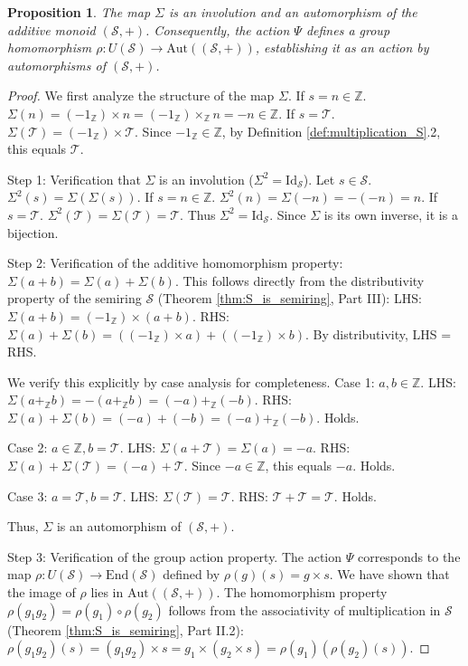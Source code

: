 \documentclass[11pt, a4paper]{article}
\theoremstyle{plain}
\newtheorem{proposition}[theorem]{Proposition}
\theoremstyle{definition}
\numberwithin{equation}{section}
\newcommand{\Z}{\mathbb{Z}}
\newcommand{\Tobj}{\mathcal{T}} %
\newcommand{\SemiringS}{\mathcal{S}}
\newcommand{\Aut}{\mathrm{Aut}}
\newcommand{\End}{\mathrm{End}}
\newcommand{\Id}{\mathrm{Id}}
\begin{document}
\begin{proposition}\label{prop:Sigma_additive_automorphism}
The map $\Sigma$ is an involution and an automorphism of the additive monoid $(\SemiringS, +)$. Consequently, the action $\Psi$ defines a group homomorphism $\rho: U(\SemiringS) \to \Aut((\SemiringS, +))$, establishing it as an action by automorphisms of $(\SemiringS, +)$.
\end{proposition}
\begin{proof}
We first analyze the structure of the map $\Sigma$.
If $s=n \in \Z$. $\Sigma(n) = (-1_{\Z})\times n = (-1_{\Z})\times_{\Z} n = -n \in \Z$.
If $s=\Tobj$. $\Sigma(\Tobj) = (-1_{\Z})\times\Tobj$. Since $-1_{\Z} \in \Z$, by Definition \ref{def:multiplication_S}.2, this equals $\Tobj$.

Step 1: Verification that $\Sigma$ is an involution ($\Sigma^2 = \Id_{\SemiringS}$).
Let $s \in \SemiringS$. $\Sigma^2(s) = \Sigma(\Sigma(s))$.
If $s=n \in \Z$. $\Sigma^2(n) = \Sigma(-n) = -(-n) = n$.
If $s=\Tobj$. $\Sigma^2(\Tobj) = \Sigma(\Tobj) = \Tobj$.
Thus $\Sigma^2 = \Id_{\SemiringS}$. Since $\Sigma$ is its own inverse, it is a bijection.

Step 2: Verification of the additive homomorphism property: $\Sigma(a+b) = \Sigma(a)+\Sigma(b)$.
This follows directly from the distributivity property of the semiring $\SemiringS$ (Theorem \ref{thm:S_is_semiring}, Part III):
LHS: $\Sigma(a+b) = (-1_{\Z}) \times (a+b)$.
RHS: $\Sigma(a)+\Sigma(b) = ((-1_{\Z}) \times a) + ((-1_{\Z}) \times b)$.
By distributivity, LHS = RHS.

We verify this explicitly by case analysis for completeness.
Case 1: $a, b \in \Z$.
LHS: $\Sigma(a+_{\Z} b) = -(a+_{\Z} b) = (-a)+_{\Z}(-b)$.
RHS: $\Sigma(a)+\Sigma(b) = (-a)+(-b) = (-a)+_{\Z}(-b)$. Holds.

Case 2: $a \in \Z, b=\Tobj$.
LHS: $\Sigma(a+\Tobj) = \Sigma(a) = -a$.
RHS: $\Sigma(a)+\Sigma(\Tobj) = (-a)+\Tobj$. Since $-a \in \Z$, this equals $-a$. Holds.

Case 3: $a=\Tobj, b=\Tobj$.
LHS: $\Sigma(\Tobj) = \Tobj$. RHS: $\Tobj+\Tobj = \Tobj$. Holds.

Thus, $\Sigma$ is an automorphism of $(\SemiringS, +)$.

Step 3: Verification of the group action property.
The action $\Psi$ corresponds to the map $\rho: U(\SemiringS) \to \End(\SemiringS)$ defined by $\rho(g)(s)=g\times s$. We have shown that the image of $\rho$ lies in $\Aut((\SemiringS, +))$.
The homomorphism property $\rho(g_1 g_2) = \rho(g_1)\circ\rho(g_2)$ follows from the associativity of multiplication in $\SemiringS$ (Theorem \ref{thm:S_is_semiring}, Part II.2):
$\rho(g_1 g_2)(s) = (g_1 g_2)\times s = g_1\times(g_2\times s) = \rho(g_1)(\rho(g_2)(s))$.
\end{proof}
\end{document}
